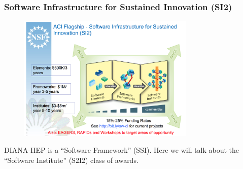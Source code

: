 \begin{frame}
\frametitle{Software Infrastructure for Sustained Innovation (SI2)}

\begin{figure}[htbp]
\begin{center}
\includegraphics[width=0.75\textwidth]{images/ramnath-si2-pi-meeting-2016.png}
\label{fig:nsfsi2}
\end{center}
\end{figure}

DIANA-HEP is a ``Software Framework'' (SSI).  Here we will talk about the ``Software Institute'' (S2I2) class of awards.

\end{frame}


